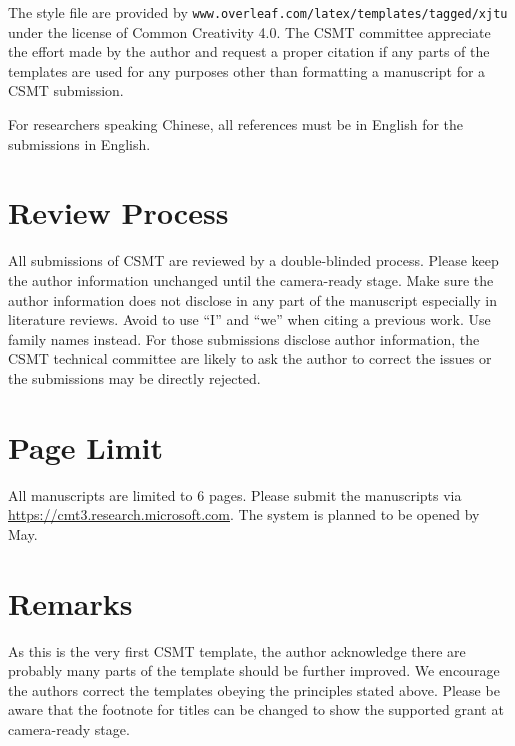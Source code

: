 \documentclass[UTF8,a4paper]{article}
\begin{document}
The style file are provided by \texttt{www.overleaf.com/latex/templates/tagged/xjtu} under the license of Common Creativity 4.0. The CSMT committee appreciate the effort made by the author and request a proper citation if any parts of the templates are used for any purposes other than formatting a manuscript for a CSMT submission.

For researchers speaking Chinese, all references must be in English for the submissions in English.

\section{Review Process}

All submissions of CSMT are reviewed by a double-blinded process. Please keep the author information unchanged until the camera-ready stage. Make sure the author information does not disclose in any part of the manuscript especially in literature reviews. Avoid to use ``I'' and ``we'' when citing a previous work. Use family names instead. For those submissions disclose author information, the CSMT technical committee are likely to ask the author to correct the issues or the submissions may be directly rejected.

\section{Page Limit}

All manuscripts are limited to 6 pages. Please submit the manuscripts via \url{https://cmt3.research.microsoft.com}. The system is planned to be opened by May.

\section{Remarks}
As this is the very first CSMT template, the author acknowledge there are probably many parts of the template should be further improved. We encourage the authors correct the templates obeying the principles stated above. Please be aware that the footnote for titles can be changed to show the supported grant at camera-ready stage.

\renewcommand{\refname}{References}


\end{document}
